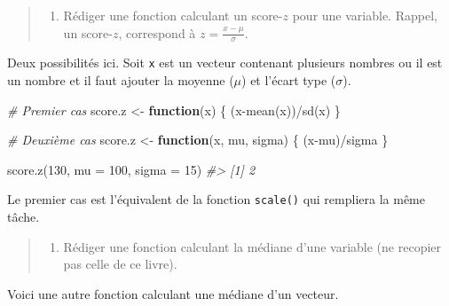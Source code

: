\documentclass[
]{book}
\newenvironment{Shaded}{}{}
\newcommand{\AttributeTok}[1]{#1}
\newcommand{\CommentTok}[1]{\textit{#1}}
\newcommand{\ControlFlowTok}[1]{\textbf{#1}}
\newcommand{\DecValTok}[1]{#1}
\newcommand{\FunctionTok}[1]{#1}
\newcommand{\NormalTok}[1]{#1}
\newcommand{\OtherTok}[1]{#1}
\newcommand{\SpecialCharTok}[1]{#1}
\providecommand{\tightlist}{%
  \setlength{\itemsep}{0pt}\setlength{\parskip}{0pt}}
\begin{document}
\begin{quote}
\begin{enumerate}
\def\labelenumi{\arabic{enumi}.}
\setcounter{enumi}{2}
\tightlist
\item
  Rédiger une fonction calculant un score-\(z\) pour une variable. Rappel, un score-\(z\), correspond à \(z=\frac{x-\mu}{\sigma}\).
\end{enumerate}
\end{quote}

Deux possibilités ici. Soit \texttt{x} est un vecteur contenant plusieurs nombres ou il est un nombre et il faut ajouter la moyenne (\(\mu\)) et l'écart type (\(\sigma\)).

\begin{Shaded}
\begin{Highlighting}[]
\CommentTok{\# Premier cas}
\NormalTok{score.z }\OtherTok{\textless{}{-}} \ControlFlowTok{function}\NormalTok{(x) \{}
\NormalTok{  (x}\SpecialCharTok{{-}}\FunctionTok{mean}\NormalTok{(x))}\SpecialCharTok{/}\FunctionTok{sd}\NormalTok{(x)}
\NormalTok{\} }

\CommentTok{\# Deuxième cas}
\NormalTok{score.z }\OtherTok{\textless{}{-}} \ControlFlowTok{function}\NormalTok{(x, mu, sigma) \{}
\NormalTok{  (x}\SpecialCharTok{{-}}\NormalTok{mu)}\SpecialCharTok{/}\NormalTok{sigma}
\NormalTok{\} }

\FunctionTok{score.z}\NormalTok{(}\DecValTok{130}\NormalTok{, }\AttributeTok{mu =} \DecValTok{100}\NormalTok{, }\AttributeTok{sigma =} \DecValTok{15}\NormalTok{)}
\CommentTok{\#\textgreater{} [1] 2}
\end{Highlighting}
\end{Shaded}

Le premier cas est l'équivalent de la fonction \texttt{scale()} qui rempliera la même tâche.

\begin{quote}
\begin{enumerate}
\def\labelenumi{\arabic{enumi}.}
\setcounter{enumi}{3}
\tightlist
\item
  Rédiger une fonction calculant la médiane d'une variable (ne recopier pas celle de ce livre).
\end{enumerate}
\end{quote}

Voici une autre fonction calculant une médiane d'un vecteur.
\end{document}
